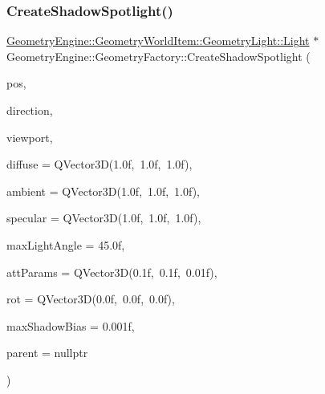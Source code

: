\subsubsection{\texorpdfstring{CreateShadowSpotlight()}{CreateShadowSpotlight()}\hspace{0.1cm}{\footnotesize\ttfamily [1/2]}}
{\footnotesize\ttfamily \mbox{\hyperlink{class_geometry_engine_1_1_geometry_world_item_1_1_geometry_light_1_1_light}{Geometry\+Engine\+::\+Geometry\+World\+Item\+::\+Geometry\+Light\+::\+Light}} $\ast$ Geometry\+Engine\+::\+Geometry\+Factory\+::\+Create\+Shadow\+Spotlight (\begin{DoxyParamCaption}\item[{const Q\+Vector3D \&}]{pos,  }\item[{const Q\+Vector3D \&}]{direction,  }\item[{const \mbox{\hyperlink{class_geometry_engine_1_1_geometry_item_utils_1_1_viewport}{Geometry\+Item\+Utils\+::\+Viewport}} \&}]{viewport,  }\item[{const Q\+Vector3D \&}]{diffuse = {\ttfamily QVector3D(1.0f,~1.0f,~1.0f)},  }\item[{const Q\+Vector3D \&}]{ambient = {\ttfamily QVector3D(1.0f,~1.0f,~1.0f)},  }\item[{const Q\+Vector3D \&}]{specular = {\ttfamily QVector3D(1.0f,~1.0f,~1.0f)},  }\item[{float}]{max\+Light\+Angle = {\ttfamily 45.0f},  }\item[{const Q\+Vector3D \&}]{att\+Params = {\ttfamily QVector3D(0.1f,~0.1f,~0.01f)},  }\item[{const Q\+Vector3D \&}]{rot = {\ttfamily QVector3D(0.0f,~0.0f,~0.0f)},  }\item[{float}]{max\+Shadow\+Bias = {\ttfamily 0.001f},  }\item[{\mbox{\hyperlink{class_geometry_engine_1_1_geometry_world_item_1_1_world_item}{Geometry\+World\+Item\+::\+World\+Item}} $\ast$}]{parent = {\ttfamily nullptr} }\end{DoxyParamCaption})\hspace{0.3cm}{\ttfamily [static]}}

